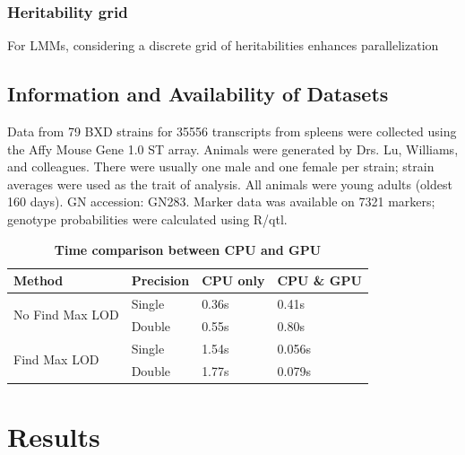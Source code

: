 \documentclass[9pt,twocolumn,twoside,lineno]{gsag3jnl}
\begin{document}
\subsubsection{Heritability grid}
For LMMs, considering a discrete grid of heritabilities enhances parallelization


\subsection{Information and Availability of Datasets}
Data from 79 BXD strains for 35556 transcripts from spleens were collected using the Affy Mouse Gene 1.0 ST array. Animals were generated by Drs. Lu, Williams, and colleagues. There were usually one male and one female per strain; strain averages were used as the trait of analysis. All animals were young adults (oldest 160 days). GN accession: GN283. Marker data was available on 7321 markers; genotype probabilities were calculated using R/qtl.

\begin{table}[htbp]
	\renewcommand{\familydefault}{\sfdefault}\normalfont
	\centering
	\caption{\bf Time comparison between CPU and GPU}
	\begin{tableminipage}{\textwidth}
		\begin{tabularx}{\textwidth}{XXXX}
			\hline
			\header Method & Precision & CPU only   & CPU \& GPU  \\
			\hline
			\multirow{2}{*}{No Find Max LOD} & Single    & 0.36s & 0.41s \\
			& Double    & 0.55s & 0.80s \\
			\multirow{2}{*}{Find Max LOD}    & Single    &1.54s       &0.056s       \\
			& Double    & 1.77s & 0.079s \\
			\hline
			
		\end{tabularx}
		\label{tab:speedup-table}
	\end{tableminipage}
\end{table}

 
\section{Results}
\end{document}
